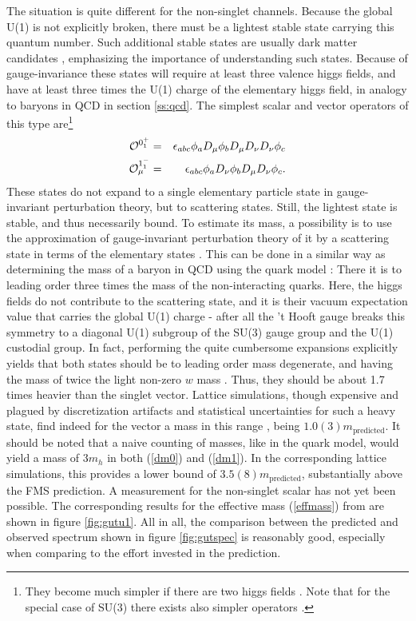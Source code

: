 \documentclass[final,12pt]{article}
\newcommand*{\no}{\noindent}
\newcommand*{\bea}{\begin{eqnarray}}
\newcommand*{\eea}{\end{eqnarray}}
\newcommand*{\pref}[1]{(\ref{#1})}
\newcommand*{\1}{1\!\!\!\bot}
\newcommand*{\op}{{\cal O}}
\begin{document}
The situation is quite different for the non-singlet channels. Because the global U(1) is not explicitly broken, there must be a lightest stable state carrying this quantum number. Such additional stable states are usually dark matter candidates \cite{Morrissey:2009tf}, emphasizing the importance of understanding such states. Because of gauge-invariance these states will require at least three valence higgs fields, and have at least three times the U(1) charge of the elementary higgs field, in analogy to baryons in QCD in section \ref{ss:qcd}. The simplest scalar and vector operators of this type are\footnote{They become much simpler if there are two higgs fields \cite{Iida:2007qp}. Note that for the special case of SU(3) there exists also simpler operators \cite{Maas:2017xzh}.} \cite{Maas:2017xzh}
\bea
\op^{0^+_1}&=&\epsilon_{abc}\phi_a D_\mu\phi_b D_\mu D_\nu D_\nu\phi_c\label{dm0}\\
\op^{1^-_1}_\mu&=&\epsilon_{abc}\phi_a D_\nu\phi_b D_\mu D_\nu\phi_c\label{dm1}.
\eea
\no These states do not expand to a single elementary particle state in gauge-invariant perturbation theory, but to scattering states. Still, the lightest state is stable, and thus necessarily bound. To estimate its mass, a possibility is to use the approximation of gauge-invariant perturbation theory of it by a scattering state in terms of the elementary states \cite{Maas:2017xzh}. This can be done in a similar way as determining the mass of a baryon in QCD using the quark model \cite{BeiglboCk:2006lfa}: There it is to leading order three times the mass of the non-interacting quarks. Here, the higgs fields do not contribute to the scattering state, and it is their vacuum expectation value that carries the global U(1) charge - after all the 't Hooft gauge breaks this symmetry to a diagonal U(1) subgroup of the SU(3) gauge group and the U(1) custodial group. In fact, performing the quite cumbersome expansions explicitly yields that both states should be to leading order mass degenerate, and having the mass of twice the light non-zero $w$ mass \cite{Maas:2017xzh}. Thus, they should be about 1.7 times heavier than the singlet vector. Lattice simulations, though expensive and plagued by discretization artifacts and statistical uncertainties for such a heavy state, find indeed for the vector a mass in this range \cite{Maas:unpublishedtoerek}, being $1.0(3)m_\text{predicted}$. It should be noted that a naive counting of masses, like in the quark model, would yield a mass of $3m_h$ in both \pref{dm0} and \pref{dm1}. In the corresponding lattice simulations, this provides a lower bound of $3.5(8)m_\text{predicted}$, substantially above the FMS prediction. A measurement for the non-singlet scalar has not yet been possible. The corresponding results for the effective mass \pref{effmass} from \cite{Maas:2017pcw,Maas:unpublishedtoerek} are shown in figure \ref{fig:gutu1}. All in all, the comparison between the predicted and observed spectrum shown in figure \ref{fig:gutspec} is reasonably good, especially when comparing to the effort invested in the prediction.
\end{document}
